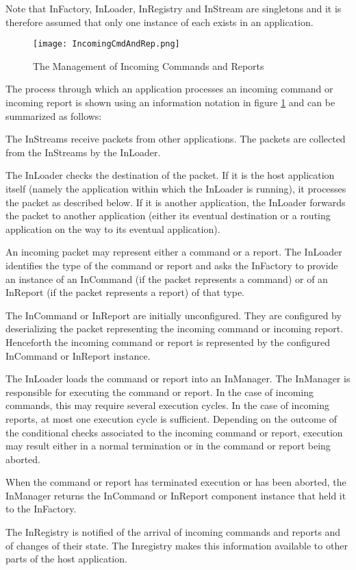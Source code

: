 Note that InFactory, InLoader, InRegistry and InStream are singletons and it is
therefore assumed that only one instance of each exists in an application. 

\begin{figure}[h]
 \centering
 \texttt{[image: IncomingCmdAndRep.png]}
 \caption{The Management of Incoming Commands and Reports}
 \label{fig:IncomingCmdAndRep}
\end{figure}

The process through which an application processes an incoming command or incoming report is shown using an information notation in figure \ref{fig:IncomingCmdAndRep} and can be summarized as follows:
\begin{fw_enumerate}
\item The InStreams receive packets from other applications. The packets are collected from the InStreams by the InLoader.
\item The InLoader checks the destination of the packet. If it is the host application itself (namely the application within which the InLoader is running), it processes the packet as described below. If it is another application, the InLoader forwards the packet to another application (either its eventual destination or a routing application on the way to its eventual application).
\item An incoming packet may represent either a command or a report. The InLoader identifies the type of the command or report and asks the InFactory to provide an instance of an InCommand (if the packet represents a command) or of an InReport (if the packet represents a report) of that type. 
\item The InCommand or InReport are initially unconfigured. They are configured by deserializing the packet representing the incoming command or incoming report. Henceforth the incoming command or report is represented by the configured InCommand or InReport instance. 
\item The InLoader loads the command or report into an InManager. The InManager is responsible for executing the command or report. In the case of incoming commands, this may require several execution cycles. In the case of incoming reports, at most one execution cycle is sufficient. Depending on the outcome of the conditional checks associated to the incoming command or report, execution may result either in a normal termination or in the command or report being aborted.
\item When the command or report has terminated execution or has been aborted, the InManager returns the InCommand or InReport component instance that held it to the InFactory.
\item The InRegistry is notified of the arrival of incoming commands and reports and of changes of their state. The Inregistry makes this information available to other parts of the host application.
\end{fw_enumerate}

